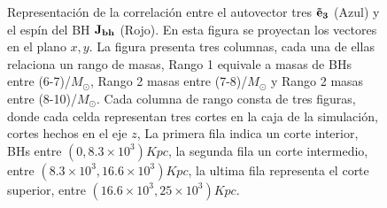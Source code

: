 \begin{figure}
\caption{Representación de la correlación entre el autovector tres ${\bf{\vec{e}}_{3}}$ (Azul) y el espín del BH ${\bf{J_{bh}}}$ (Rojo). En esta figura se proyectan los vectores en el plano $x,y$. La figura presenta tres columnas, cada una de ellas relaciona un rango de masas, Rango 1 equivale a masas de BHs entre (6-7)/$M_{\odot}$, Rango 2 masas entre (7-8)/$M_{\odot}$ y Rango 2 masas entre (8-10)/$M_{\odot}$. Cada columna de rango consta de tres figuras, donde cada celda  representan tres cortes en la caja de la simulación, cortes hechos en el eje $z$, La primera fila indica un corte interior, BHs entre $(0, 8.3\times10^{3}) Kpc$,  la segunda fila un corte intermedio, entre $(8.3\times10^{3}, 16.6\times10^{3}) Kpc$, la ultima fila representa el corte superior, entre  $ (16.6\times10^{3}, 25\times10^{3}) Kpc$. } \label{} \end{figure}







